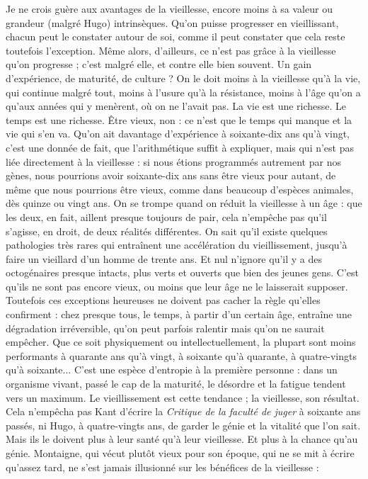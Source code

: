 Je ne crois guère aux avantages de la vieillesse, encore moins à sa valeur ou
grandeur (malgré Hugo) intrinsèques. Qu’on puisse progresser en vieillissant,
chacun peut le constater autour de soi, comme il peut constater que cela reste
toutefois l’exception. Même alors, d’ailleurs, ce n’est pas grâce à la vieillesse
qu’on progresse ; c’est malgré elle, et contre elle bien souvent. Un gain d’expérience,
de maturité, de culture ? On le doit moins à la vieillesse qu’à la vie, qui
continue malgré tout, moins à l’usure qu’à la résistance, moins à l’âge qu'on a
qu'aux années qui y menèrent, où on ne l’avait pas. La vie est une richesse. Le
temps est une richesse. Être vieux, non : ce n’est que le temps qui manque et la
vie qui s’en va. Qu'on ait davantage d’expérience à soixante-dix ans qu'à vingt,
c'est une donnée de fait, que l’arithmétique suffit à expliquer, mais qui n’est
pas liée directement à la vieillesse : si nous étions programmés autrement par
nos gènes, nous pourrions avoir soixante-dix ans sans être vieux pour autant, de
même que nous pourrions être vieux, comme dans beaucoup d'espèces animales,
dès quinze ou vingt ans. On se trompe quand on réduit la vieillesse à un
âge : que les deux, en fait, aillent presque toujours de pair, cela n’empêche pas
qu’il s’agisse, en droit, de deux réalités différentes. On sait qu’il existe quelques
pathologies très rares qui entraînent une accélération du vieillissement, jusqu’à
faire un vieillard d’un homme de trente ans. Et nul n’ignore qu’il y a des octogénaires
presque intacts, plus verts et ouverts que bien des jeunes gens. C'est
qu’ils ne sont pas encore vieux, ou moins que leur âge ne le laisserait supposer.
Toutefois ces exceptions heureuses ne doivent pas cacher la règle qu’elles
confirment : chez presque tous, le temps, à partir d’un certain âge, entraîne une
dégradation irréversible, qu’on peut parfois ralentir mais qu’on ne saurait
empêcher. Que ce soit physiquement ou intellectuellement, la plupart sont
moins performants à quarante ans qu’à vingt, à soixante qu'à quarante, à
quatre-vingts qu'à soixante... C’est une espèce d’entropie à la première
personne : dans un organisme vivant, passé le cap de la maturité, le désordre et
la fatigue tendent vers un maximum. Le vieillissement est cette tendance ; la
vieillesse, son résultat. Cela n’empêcha pas Kant d’écrire la {\it Critique de la faculté
de juger} à soixante ans passés, ni Hugo, à quatre-vingts ans, de garder le génie
et la vitalité que l’on sait. Mais ils le doivent plus à leur santé qu’à leur vieillesse.
Et plus à la chance qu’au génie. Montaigne, qui vécut plutôt vieux pour son
époque, qui ne se mit à écrire qu'assez tard, ne s’est jamais illusionné sur les
bénéfices de la vieillesse :

